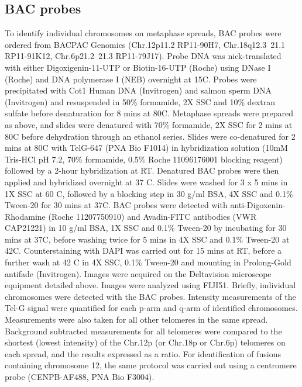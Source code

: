 \documentclass[phd,tocprelim]{cornell}
\begin{document}
\subsection*{BAC probes}
To identify individual chromosomes on metaphase spreads, BAC probes were ordered from BACPAC Genomics (Chr.12p11.2 RP11-90H7, Chr.18q12.3~21.1 RP11-91K12, Chr.6p21.2~21.3 RP11-79J17). Probe DNA was nick-translated with either Digoxigenin-11-UTP or Biotin-16-UTP (Roche) using DNase I (Roche) and DNA polymerase I (NEB) overnight at 15\textdegree C. Probes were precipitated with Cot1 Human DNA (Invitrogen) and salmon sperm DNA (Invitrogen) and resuspended in 50\% formamide, 2X SSC and 10\% dextran sulfate before denaturation for 8 mins at 80\textdegree C. Metaphase spreads were prepared as above, and slides were denatured with 70\% formamide, 2X SSC for 2 mins at 80\textdegree C before dehydration through an ethanol series. Slides were co-denatured for 2 mins at 80\textdegree C with TelG-647 (PNA Bio F1014) in hybridization solution (10mM Tris-HCl pH 7.2, 70\% formamide, 0.5\% Roche 11096176001 blocking reagent) followed by a 2-hour hybridization at RT. Denatured BAC probes were then applied and hybridized overnight at 37 \textdegree C. Slides were washed for 3 x 5 mins in 1X SSC at 60 \textdegree C, followed by a blocking step in 30 \textmu g/ml BSA, 4X SSC and 0.1\% Tween-20 for 30 mins at 37\textdegree C. BAC probes were detected with anti-Digoxenin-Rhodamine (Roche 11207750910) and Avadin-FITC antibodies (VWR CAP21221) in 10 \textmu g/ml BSA, 1X SSC and 0.1\% Tween-20 by incubating for 30 mins at 37\textdegree C, before washing twice for 5 mins in 4X SSC and 0.1\% Tween-20 at 42\textdegree C. Counterstaining with DAPI was carried out for 15 mins at RT, before a further wash at 42 \textdegree C in 4X SSC, 0.1\% Tween-20 and mounting in Prolong-Gold antifade (Invitrogen). Images were acquired on the Deltavision microscope equipment detailed above. Images were analyzed using FIJI51. Briefly, individual chromosomes were detected with the BAC probes. Intensity measurements of the Tel-G signal were quantified for each p-arm and q-arm of identified chromosomes. Measurements were also taken for all other telomeres in the same spread. Background subtracted measurements for all telomeres were compared to the shortest (lowest intensity) of the Chr.12p (or Chr.18p or Chr.6p) telomeres on each spread, and the results expressed as a ratio. For identification of fusions containing chromosome 12, the same protocol was carried out using a centromere probe (CENPB-AF488, PNA Bio F3004).
\end{document}

